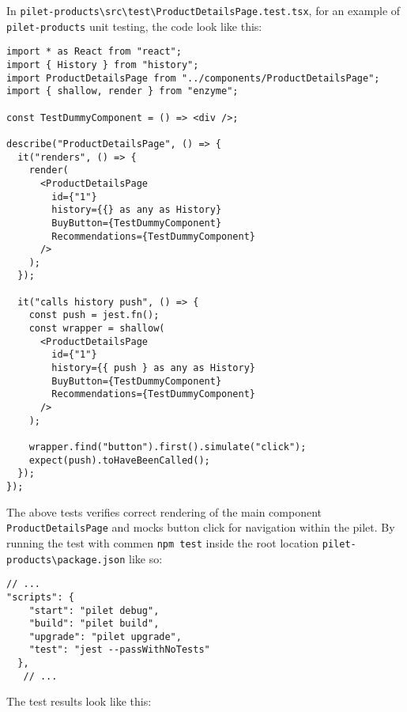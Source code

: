 \documentclass[a4paper]{book}
\begin{document}
In \verb|pilet-products\src\test\ProductDetailsPage.test.tsx|, for an example of \verb|pilet-products| unit testing, the code look like this:

\begin{lstlisting}[caption={ProductDetailsPage.test.tsx}]
  import * as React from "react";
import { History } from "history";
import ProductDetailsPage from "../components/ProductDetailsPage";
import { shallow, render } from "enzyme";

const TestDummyComponent = () => <div />;

describe("ProductDetailsPage", () => {
  it("renders", () => {
    render(
      <ProductDetailsPage
        id={"1"}
        history={{} as any as History}
        BuyButton={TestDummyComponent}
        Recommendations={TestDummyComponent}
      />
    );
  });

  it("calls history push", () => {
    const push = jest.fn();
    const wrapper = shallow(
      <ProductDetailsPage
        id={"1"}
        history={{ push } as any as History}
        BuyButton={TestDummyComponent}
        Recommendations={TestDummyComponent}
      />
    );

    wrapper.find("button").first().simulate("click");
    expect(push).toHaveBeenCalled();
  });
});
\end{lstlisting}

The above tests verifies correct rendering of the main component \verb|ProductDetailsPage| and mocks button click for navigation within the pilet. By running the test with commen \verb|npm test| inside the root location \verb|pilet-products\package.json| like so:

\begin{lstlisting}[caption={pilet-products package.json file}]
 // ...
"scripts": {
    "start": "pilet debug",
    "build": "pilet build",
    "upgrade": "pilet upgrade",
    "test": "jest --passWithNoTests"
  },
   // ...
\end{lstlisting}

The test results look like this:
\end{document}
